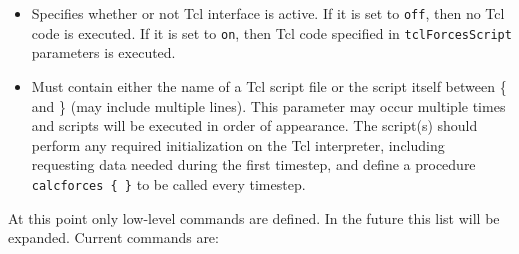 \begin{itemize}

\item
{}
{Specifies whether or not Tcl interface is active.  If it 
is set to {\tt off}, then no Tcl code is executed.  
If it is set to {\tt on}, then Tcl code specified in
{\tt tclForcesScript} parameters is executed.}

\item
{}
{Must contain either the name of a Tcl script file or the script 
itself between \{ and \} (may include multiple lines).
This parameter may occur multiple times and scripts will be executed
in order of appearance.
The script(s) should perform any required initialization on the Tcl interpreter, including requesting data needed during the first timestep, and define a procedure {\tt calcforces \{ \}} to be called every timestep.
}

\end{itemize}

At this point only low-level commands are defined.
In the future this list will be expanded.  Current commands are:

